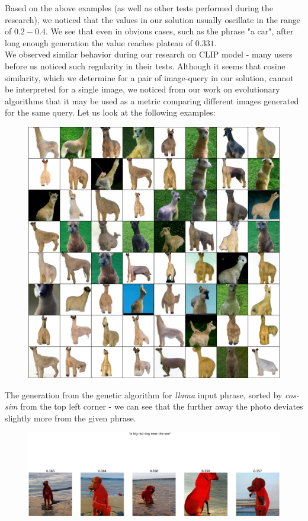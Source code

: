 \documentclass[12pt,a4paper,openany]{book}
\begin{document}
\noindent Based on the above examples (as well as other tests performed during the research), we noticed that the values in our solution usually oscillate in the range of $0.2 - 0.4$. We see that even in obvious cases, such as the phrase "a car", after long enough generation the value reaches plateau of $0.331$.  \\
\noindent We observed similar behavior during our research on CLIP model - many users before us noticed such regularity in their tests.
Although it seems that cosine similarity, which we determine for a pair of image-query in our solution, cannot be interpreted for a single image, we noticed from our work on evolutionary algorithms that it may be used as a metric comparing different images generated for the same query. Let us look at the following examples:
\begin{figure}[H]
    \centering
    \includegraphics[scale=0.2]{figs/batch_loop_7.jpg}
\end{figure}
\noindent The generation from the genetic algorithm for \textit{llama} input phrase,  sorted by \textit{cos-sim} from the top left corner - we can see that the further away the photo deviates slightly more from the given phrase. \\
\begin{figure}[H]
    \centering
    \includegraphics[scale=0.08]{figs/bigreddog.png}
\end{figure}
\end{document}
